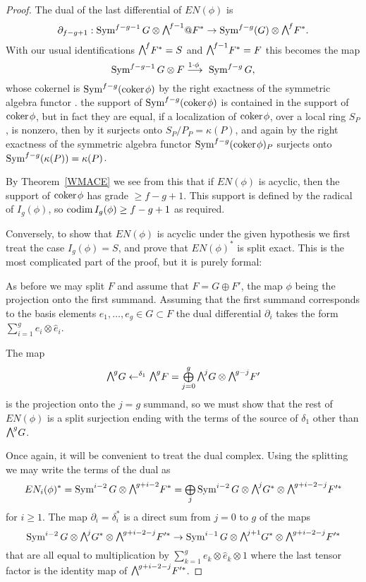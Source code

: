 \begin{proof}
The dual of the last differential of $EN(\phi)$ is
$$
\partial_{f-g+1}: \Sym^{f-g-1}G \otimes \mwedge^{f-1}@F^{*} \to
\Sym^{f-g}(G) \otimes \mwedge^{f}F^{*}.
$$
With our usual identifications $\mwedge^{f}F^{*} = S$ and
$\mwedge^{f-1}F^{*} = F$ this becomes the map
$$
\Sym^{f-g-1}G \otimes F \ruto {\!1\cdot \phi} \Sym^{f-g}G
,
$$
whose cokernel is $\operatorname{Sym}^{f-g}({\rm{coker}\kern1pt} \phi)$ by the right exactness of
the symmetric algebra functor \cite[Proposition A2.2]{Eisenbud1995}. 
the
support of $\operatorname{Sym}^{f-g}({\rm{coker}\kern1pt} \phi)$ is contained in the support
of ${\rm{coker}\kern1pt} \phi$, but in fact they are equal,
if a localization of
${\rm{coker}\kern1pt} \phi$, over a local ring $S_{P}$,
is nonzero, then by
it surjects onto $S_{P}/P_{P} = \kappa(P)$, and again
%
by the right exactness
of the symmetric algebra functor $\operatorname{Sym}^{f-g}({\rm{coker}\kern1pt} \phi)_{P}$ surjects
\unskip\break %
onto
$\operatorname{Sym}^{f-g}(\kappa(P)) = \kappa(P)$.

By Theorem~\ref{WMACE} we see from this that if $EN(\phi)$ is acyclic,
then the support of ${\rm{coker}\kern1pt} \phi$
has grade $\geq f-g+1$. This support is defined by the radical of
$I_{g}(\phi)$, so $\operatorname{codim} I_{g}(\phi)\geq f-g+1$ as required.

Conversely, to show that $EN(\phi)$ is acyclic under the given hypothesis
we first treat the case
$I_{g}(\phi) = S$, and prove that $EN(\phi)^{*}$ is split exact. This
is the most complicated part of the proof,
but it is purely formal:

As before we may split $F$ and
assume that $F = G\oplus F'$, the map $\phi$ being the projection onto
the first summand.
Assuming that the first summand corresponds to the basis elements $e_{1},
\dots, e_{g}\in G\subset F$
the dual differential $\partial_{i}$ takes the form $\sum_{i=1}^{g}
e_{i}\otimes \hat e_{i}$.

The map
$$
\mwedge^{g}G\lTo^{\delta_{1}}
\mwedge^{g}F =\tsty\bigoplus\limits_{j=0}^{g}\mwedge^{j}G\otimes \mwedge^{g-j}F'
$$
is the projection onto the $j=g$ summand, so we must show that the rest
of $EN(\phi)$ is a split surjection
ending with the terms of the source of $\delta_{1}$ other than
$\mwedge^{g}G$.

Once again, it will be convenient to treat the dual complex. Using
the splitting
we may write the terms of the dual as
$$
EN_{i}(\phi)^{*} = \Sym^{i-2}G \otimes  \mwedge^{g+i-2}F^{*}  =
\tsty\bigoplus\limits_{j} \Sym^{i-2}G \otimes  \mwedge^{j}G^{*} \otimes
\mwedge^{g+i-2-j}F'^{*}
$$
for $i\geq 1$.
The map $\partial_{i}= \delta_{i}^{*}$ is a direct sum from $j=0$ to $g$
of the maps
$$
\Sym^{i-2}G \otimes  \mwedge^{j}G^{*} \otimes \mwedge^{g+i-2-j}F'^{*}
\to
\Sym^{i-1}G \otimes  \mwedge^{j+1}G^{*} \otimes \mwedge^{g+i-2-j}F'^{*}
$$
that are all equal to  multiplication by $\sum_{k=1}^{g} e_{k}\otimes
\hat e_{k}\otimes 1$
where the last tensor factor is the identity map of
$\mwedge^{g+i-2-j}F'^{*}$.


\end{proof}
